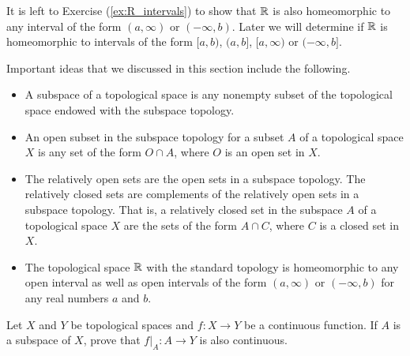 It is left to Exercise (\ref{ex:R_intervals}) to show that $\mathbb{R}$ is also homeomorphic to any interval of the form $(a,\infty)$ or $(-\infty,b)$. Later we will determine if $\mathbb{R}$ is homeomorphic to intervals of the form $[a,b)$, $(a,b]$, $[a, \infty)$ or $(-\infty, b]$. 


Important ideas that we discussed in this section include the following.
\begin{itemize}
\item A subspace of a topological space is any nonempty subset of the topological space endowed with the subspace topology. 
\item An open subset in the subspace topology for a subset $A$ of a topological space $X$ is any set of the form $O \cap A$, where $O$ is an open set in $X$. 
\item The relatively open sets are the open sets in a subspace topology. The relatively closed sets are complements of the relatively open sets in a subspace topology. That is, a relatively closed set in the subspace $A$ of a topological space $X$ are the sets of the form $A \cap C$, where $C$ is a closed set in $X$.  
\item The topological space $\mathbb{R}$ with the standard topology is homeomorphic to any open interval as well as open intervals of the form $(a,\infty)$ or $(-\infty,b)$ for any real numbers $a$ and $b$. 
\end{itemize}


\be


\item Let $X$ and $Y$ be topological spaces and $f: X \to Y$ be a continuous function. If $A$ is a subspace of $X$, prove that $f|_A : A \to Y$ is also continuous.

\begin{comment}

\ExerciseSolution Let $A$ be a subspace of $X$. To show that $f|_A$ is continuous, let $O$ be an open subset of $Y$. Then $f^{-1}(O)$ is open in $X$. So $f^{-1}(O) \cap A$ is open in $A$. We will demonstrate that $f^{-1}(O) \cap A = (f|_A)^{-1}(O)$, which will show that $f|_A$ is continuous. 

Let $x \in f^{-1}(O) \cap A$. Then $x \in f^{-1}(O)$ and $x \in A$. Since $f(x) \in O$ and $x \in A$, it follows that $f|_A(x) \in O$ and $x \in (f|_A)^{-1}(O)$. So $f^{-1}(O) \cap A \subseteq (f|_A)^{-1}(O)$.

Now let $x \in (f|_A)^{-1}(O)$. Then $x$ must be in $A$ and $f|_A(x) \in O$. So $f(x) \in O$ and $x \in f^{-1}(O) \cap A$. We conclude that $(f|_A)^{-1}(O) \subseteq f^{-1}(O) \cap A$ and, consequently, that $f^{-1}(O) \cap A = (f|_A)^{-1}(O)$.

\end{comment}

